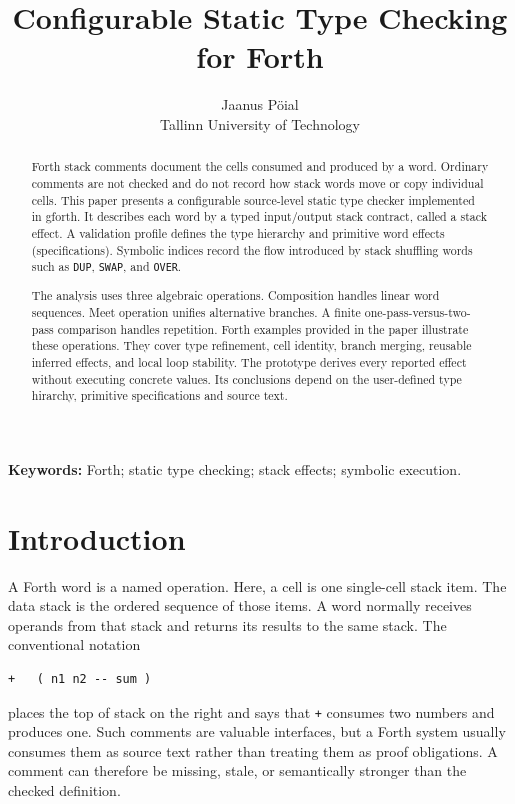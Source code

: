 \documentclass[11pt,a4paper]{article}
\title{Configurable Static Type Checking for Forth}
\author{Jaanus Pöial\\Tallinn University of Technology}
\date{}
\begin{document}
\maketitle

\begin{abstract}
Forth stack comments document the cells consumed and produced by a word.
Ordinary comments are not checked and do not record how stack words
move or copy individual cells.  This paper presents a configurable source-level
static type checker implemented in gforth.  It describes each word by a typed 
input/output stack contract, called a stack effect.  A validation profile defines the type 
hierarchy and primitive word effects (specifications). Symbolic indices record 
the flow introduced by stack shuffling words such as
\texttt{DUP}, \texttt{SWAP}, and \texttt{OVER}.

The analysis uses three algebraic operations.  Composition handles linear word
sequences.  Meet operation unifies alternative branches.  A finite
one-pass-versus-two-pass comparison handles repetition. Forth examples provided in the paper
illustrate these operations.  They cover type refinement, cell identity,
branch merging, reusable inferred effects, and local
loop stability. The prototype derives every reported effect without executing concrete
values. Its conclusions depend on the user-defined type hirarchy, primitive
specifications and source text.
\end{abstract}

\noindent\textbf{Keywords:} Forth; static type checking; stack effects;
symbolic execution.

\section{Introduction}

A Forth word is a named operation.  Here, a cell is one single-cell stack
item.  The data stack is the ordered sequence of those items.  A word normally
receives operands from that stack and returns its results to the same stack.
The conventional notation
\begin{verbatim}
+   ( n1 n2 -- sum )
\end{verbatim}
places the top of stack on the right and says that \texttt{+} consumes two
numbers and produces one.  Such comments are valuable interfaces, but a Forth
system usually consumes them as source text rather than treating them as
proof obligations.  A comment can therefore be missing, stale, or semantically
stronger than the checked definition.
\end{document}
